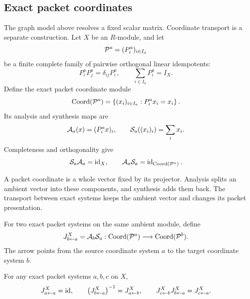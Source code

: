 \subsection{Exact packet coordinates}

The graph model above resolves a fixed scalar matrix.  Coordinate transport
is a separate construction.  Let $X$ be an $R$-module, and let
\[
\mathcal P^a=(P^a_i)_{i\in I_a}
\]
be a finite complete family of pairwise orthogonal linear idempotents:
\[
P^a_iP^a_j=\delta_{ij}P^a_i,
\qquad
\sum_{i\in I_a}P^a_i=I_X.
\]
Define the exact packet coordinate module
\[
\operatorname{Coord}(\mathcal P^a)
=
\left\{(x_i)_{i\in I_a}:P^a_ix_i=x_i\right\}.
\]
Its analysis and synthesis maps are
\[
\mathcal A_a(x)=(P^a_ix)_i,
\qquad
\mathcal S_a((x_i)_i)=\sum_ix_i.
\]
Completeness and orthogonality give
\[
\mathcal S_a\mathcal A_a=\operatorname{id}_X,
\qquad
\mathcal A_a\mathcal S_a=\operatorname{id}_{\operatorname{Coord}(\mathcal P^a)}.
\]

\begin{keyidea}[title={What a packet coordinate contains}]
A packet coordinate is a whole vector fixed by its projector. Analysis splits
an ambient vector into these components, and synthesis adds them back. The
transport between exact systems keeps the ambient vector and changes its
packet presentation.
\end{keyidea}

\begin{definition}
\label{def:canonical-J}
For two exact packet systems on the same ambient module, define
\[
  J^X_{b\leftarrow a}
  =
  \mathcal A_b\mathcal S_a:
  \operatorname{Coord}(\mathcal P^a)\longrightarrow\operatorname{Coord}(\mathcal P^b).
\]
The arrow points from the source coordinate system $a$ to the target
coordinate system $b$.
\end{definition}

\begin{theorem}
\label{thm:J-cocycle}
For any exact packet systems $a,b,c$ on $X$,
\[
J^X_{a\leftarrow a}=\operatorname{id},
\qquad
\left(J^X_{b\leftarrow a}\right)^{-1}=J^X_{a\leftarrow b},
\qquad
J^X_{c\leftarrow b}J^X_{b\leftarrow a}=J^X_{c\leftarrow a}.
\]
\end{theorem}

